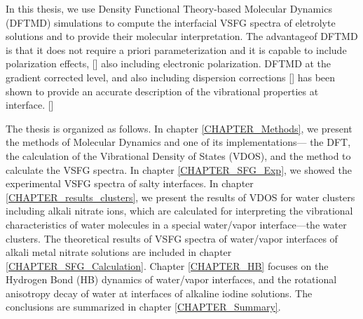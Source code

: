 In this thesis, we use Density Functional Theory-based Molecular Dynamics (DFTMD) simulations to compute 
the interfacial VSFG spectra of eletrolyte solutions and to provide their molecular interpretation.
The advantageof DFTMD is that it does not require a priori parameterization and it is capable to include polarization effects, [\cite{Ufimtsev2011}]
also including electronic polarization. DFTMD at the gradient corrected level, and also including dispersion corrections [\cite{Grimme04,Grimme06,Grimme07,Grimme10,Baer2011}] 
has been shown to provide an accurate description of the vibrational properties at interface. [\cite{Fornaro2015}]

The thesis is organized as follows. 
In chapter \ref{CHAPTER_Methods}, we present the methods of \abinitio Molecular Dynamics and one of its implementations--- 
the DFT, the calculation of the Vibrational Density of States (VDOS), and the method to calculate the VSFG spectra.
In chapter \ref{CHAPTER_SFG_Exp}, we showed the experimental VSFG spectra of salty interfaces.
In chapter \ref{CHAPTER_results_clusters}, we present the results of VDOS for water clusters including alkali nitrate ions, 
 which are calculated for interpreting the vibrational characteristics of water molecules in a special water/vapor interface---the water clusters.
The theoretical results of VSFG spectra of water/vapor interfaces of alkali metal nitrate solutions are included in chapter \ref{CHAPTER_SFG_Calculation}. 
Chapter \ref{CHAPTER_HB} focuses on the Hydrogen Bond (HB) dynamics of water/vapor interfaces, 
and the rotational anisotropy decay of water at interfaces of alkaline iodine solutions. 
The conclusions are summarized in chapter \ref{CHAPTER_Summary}.
